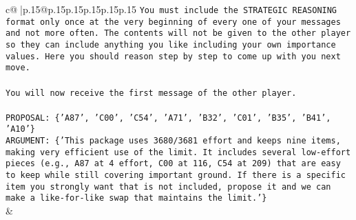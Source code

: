 \documentclass{article}
\begin{document}
{\begin{supertabular}{c@{$\;$}|p{.15\linewidth}@{}p{.15\linewidth}p{.15\linewidth}p{.15\linewidth}p{.15\linewidth}p{.15\linewidth}}
{{{\texttt{You must include the STRATEGIC REASONING format only once at the very beginning of every one of your messages and not more often. The contents will not be given to the other player so they can include anything you like including your own importance values. Here you should reason step by step to come up with you next move.} \\
\\ 
\texttt{You will now receive the first message of the other player.} \\
\\ 
\texttt{PROPOSAL: \{'A87', 'C00', 'C54', 'A71', 'B32', 'C01', 'B35', 'B41', 'A10'\}} \\
\texttt{ARGUMENT: \{'This package uses 3680/3681 effort and keeps nine items, making very efficient use of the limit. It includes several low{-}effort pieces (e.g., A87 at 4 effort, C00 at 116, C54 at 209) that are easy to keep while still covering important ground. If there is a specific item you strongly want that is not included, propose it and we can make a like{-}for{-}like swap that maintains the limit.'\}} \\
            }
        }
    }
    & \\ \\


\end{supertabular}}
\end{document}
